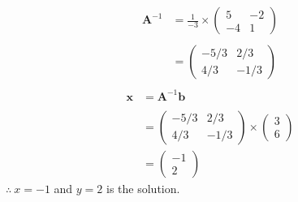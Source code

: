 \documentclass[12pt,letterpaper,fleqn]{article}
\theoremstyle{definition}
\begin{document}
	\begin{equation*}
	\begin{split}
	\textbf{A}^{-1} &= \frac{1}{-3} \times 
	\begin{pmatrix}
	5 &-2\\
	-4 &1
	\end{pmatrix}\\
	\\
	&= \begin{pmatrix}
	-5/3 &2/3\\
	4/3 &-1/3
	\end{pmatrix}\\
	\end{split}
	\end{equation*}
	\begin{equation*}
	\begin{split}
	\textbf{x} &= \textbf{A}^{-1} \textbf{b}\\
	\\
	&= 
	\begin{pmatrix}
	-5/3 &2/3\\
	4/3 &-1/3	
	\end{pmatrix} \times 
	\begin{pmatrix}
	3\\
	6	
	\end{pmatrix}\\
	&= 
	\begin{pmatrix}
	-1\\
	2
	\end{pmatrix}
	\end{split}
	\end{equation*}
	$\therefore ~x = -1$ and $y = 2$ is the solution.
	
\end{document}
